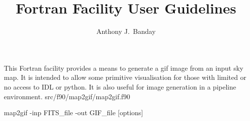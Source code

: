 
\sloppy


\title{\healpix Fortran Facility User Guidelines}
 \section[map2gif]{\nosectionname}
\label{fac:map2gif}
\author{Anthony J.~Banday}

\begin{facility}
{This Fortran facility provides a means to generate a
gif image from an input \healpix sky map. It is intended to allow some
primitive visualisation for those with limited or no access to IDL or python. 
It is also useful for image generation in a pipeline environment.}
{src/f90/map2gif/map2gif.f90}
\end{facility}

\begin{f90facility}
{map2gif -inp FITS\_file -out GIF\_file [options]}
\end{f90facility}

